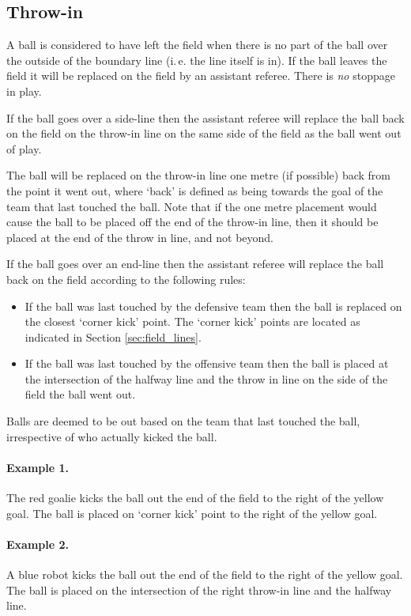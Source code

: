 \documentclass[12pt]{article}
\newcommand{\ie}{\mbox{i.\,e.}\xspace}
\begin{document}
\subsection{Throw-in}\label{sec:throw_in}

A ball is considered to have left the field when there is no part of the ball
over the outside of the boundary line  (\ie the line itself is in).
If the ball leaves the field it will be replaced on the field by an
assistant referee. There is \emph{no} stoppage in play.

If the ball goes over a side-line then the assistant referee will
replace the ball back on the field on the throw-in line on the same
side of the field as the ball went out of play.

The ball will be replaced on the throw-in line one metre (if possible)
back from the point it went out, where `back' is defined as being towards
the goal of the team that last touched the ball. Note that if the one metre placement would cause the ball to be placed
off the end of the throw-in line, then it should be placed at the end of the throw in line, and not beyond.

If the ball goes over an end-line then the assistant referee will
replace the ball back on the field according to the following rules:
\begin{itemize}
\item If the ball was last touched by the defensive team then the ball
  is replaced on the closest `corner kick' point. The `corner kick'
  points are located as indicated in Section \ref{sec:field_lines}.
\item If the ball was last touched by the offensive team then the ball
  is placed at the intersection of the halfway line and the throw in line on the side of the field the ball went
  out.
\end{itemize}

Balls are deemed to be out based on the team that last touched the
ball, irrespective of who actually kicked the ball.

\paragraph{Example 1.} The red goalie kicks the ball out the end of the
field to the right of the yellow goal.  The ball is placed on `corner kick' point
to the right of the yellow goal.

\paragraph{Example 2.} A blue robot kicks the ball out the end of the
field to the right of the yellow goal. The ball is placed on the intersection
of the right throw-in line and the halfway line.
\end{document}
